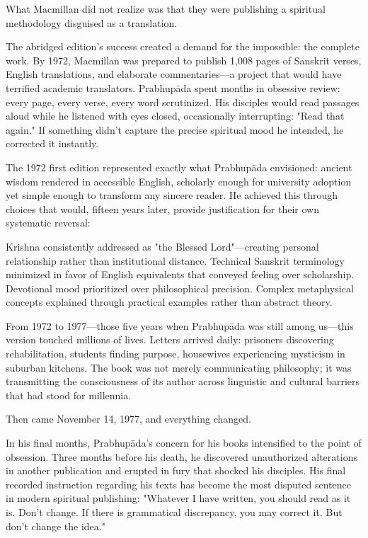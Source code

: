 \documentclass[12pt,twoside]{book}
\begin{document}
What Macmillan did not realize was that they were publishing a spiritual methodology disguised as a translation.

The abridged edition's success created a demand for the impossible: the complete work. By 1972, Macmillan was prepared to publish 1,008 pages of Sanskrit verses, English translations, and elaborate commentaries—a project that would have terrified academic translators. Prabhupāda spent months in obsessive review: every page, every verse, every word scrutinized. His disciples would read passages aloud while he listened with eyes closed, occasionally interrupting: "Read that again." If something didn't capture the precise spiritual mood he intended, he corrected it instantly.

The 1972 first edition represented exactly what Prabhupāda envisioned: ancient wisdom rendered in accessible English, scholarly enough for university adoption yet simple enough to transform any sincere reader. He achieved this through choices that would, fifteen years later, provide justification for their own systematic reversal:

Krishna consistently addressed as "the Blessed Lord"—creating personal relationship rather than institutional distance. Technical Sanskrit terminology minimized in favor of English equivalents that conveyed feeling over scholarship. Devotional mood prioritized over philosophical precision. Complex metaphysical concepts explained through practical examples rather than abstract theory.

From 1972 to 1977—those five years when Prabhupāda was still among us—this version touched millions of lives. Letters arrived daily: prisoners discovering rehabilitation, students finding purpose, housewives experiencing mysticism in suburban kitchens. The book was not merely communicating philosophy; it was transmitting the consciousness of its author across linguistic and cultural barriers that had stood for millennia.

Then came November 14, 1977, and everything changed.

In his final months, Prabhupāda's concern for his books intensified to the point of obsession. Three months before his death, he discovered unauthorized alterations in another publication and erupted in fury that shocked his disciples. His final recorded instruction regarding his texts has become the most disputed sentence in modern spiritual publishing: "Whatever I have written, you should read as it is. Don't change. If there is grammatical discrepancy, you may correct it. But don't change the idea."
\end{document}
